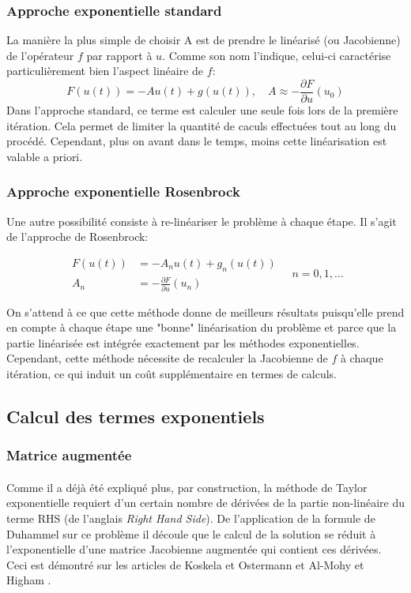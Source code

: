 \subsubsection{Approche exponentielle standard}
La manière la plus simple de choisir A est de prendre le linéarisé (ou Jacobienne) de l'opérateur $f$ par rapport à $u$. Comme son nom l'indique, celui-ci caractérise particulièrement bien l'aspect linéaire de $f$:
\begin{equation} 
    F(u(t))=-A u(t)+g(u(t)), \quad A \approx-\frac{\partial F}{\partial u}\left(u_{0}\right)
\end{equation}
Dans l'approche standard, ce terme est calculer une seule fois lors de la première itération. Cela permet de limiter la quantité de caculs effectuées tout au long du procédé. Cependant, plus on avant dans le temps, moins cette linéarisation est valable a priori.
\subsubsection{Approche exponentielle Rosenbrock}
Une autre possibilité consiste à re-linéariser le problème à chaque étape. Il s'agit de l'approche de Rosenbrock:

\begin{equation} 
    \begin{aligned} F(u(t)) &=-A_{n} u(t)+g_{n}(u(t)) \\ A_{n} &=-\frac{\partial F}{\partial u}\left(u_{n}\right) \end{aligned} \quad n=0,1, \ldots
\end{equation}

On s'attend à ce que cette méthode donne de meilleurs résultats puisqu'elle prend en compte à chaque étape une "bonne" linéarisation du problème et parce que la partie linéarisée est intégrée exactement par les méthodes exponentielles. Cependant, cette méthode nécessite de recalculer la Jacobienne de $f$ à chaque itération, ce qui induit un coût supplémentaire en termes de calculs.

\subsection{Calcul des termes exponentiels}
\subsubsection{Matrice augmentée}

\paragraph{}
Comme il a déjà été expliqué plus, par construction, la méthode de Taylor exponentielle requiert d'un certain nombre de dérivées de la partie non-linéaire du terme RHS (de l'anglais \textit{Right Hand Side}). De l'application de la formule de Duhammel sur ce problème il découle que le calcul de la solution se réduit à l'exponentielle d'une matrice Jacobienne augmentée qui contient ces dérivées. Ceci est démontré sur les articles de Koskela et Ostermann \cite{Taylor} et Al-Mohy et Higham \cite{ExpIntegrators}.

